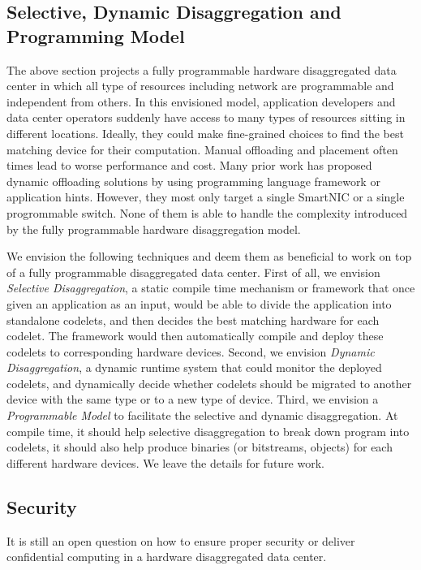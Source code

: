 \subsection{Selective, Dynamic Disaggregation and Programming Model}

The above section projects a fully programmable hardware disaggregated data center
in which all type of resources including network are programmable and independent from others.
In this envisioned model, application developers and data center operators
suddenly have access to many types of resources sitting in different locations.
Ideally, they could make fine-grained choices to find the best matching device for their computation.
Manual offloading and placement often times lead to worse performance and cost.
Many prior work has proposed dynamic offloading solutions by using programming language framework or application hints.
However, they most only target a single SmartNIC or a single progrommable switch.
None of them is able to handle the complexity introduced by the fully programmable hardware disaggregation model.

We envision the following techniques and
deem them as beneficial to work on top of a fully programmable disaggregated data center.
%
First of all, we envision \textit{Selective Disaggregation},
a static compile time mechanism or framework that once given an application as an input,
would be able to divide the application into standalone codelets, 
and then decides the best matching hardware for each codelet.
The framework would then automatically compile and deploy these codelets to corresponding hardware devices.
%
Second, we envision \textit{Dynamic Disaggregation},
a dynamic runtime system that could monitor the deployed codelets,
and dynamically decide whether codelets
should be migrated to another device with the same type or to
a new type of device.
%
Third, we envision a \textit{Programmable Model}
to facilitate the selective and dynamic disaggregation.
At compile time, it should help selective disaggregation to break down program into codelets,
it should also help produce binaries (or bitstreams, objects) for each different hardware devices.
We leave the details for future work.

\subsection{Security}

It is still an open question on how to ensure proper security
or deliver confidential computing in a hardware disaggregated data center.

